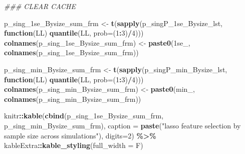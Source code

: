 \documentclass[
]{book}
\newenvironment{Shaded}{\begin{snugshade}}{\end{snugshade}}
\newcommand{\CommentTok}[1]{\textcolor[rgb]{0.56,0.35,0.01}{\textit{#1}}}
\newcommand{\ControlFlowTok}[1]{\textcolor[rgb]{0.13,0.29,0.53}{\textbf{#1}}}
\newcommand{\DataTypeTok}[1]{\textcolor[rgb]{0.13,0.29,0.53}{#1}}
\newcommand{\DecValTok}[1]{\textcolor[rgb]{0.00,0.00,0.81}{#1}}
\newcommand{\KeywordTok}[1]{\textcolor[rgb]{0.13,0.29,0.53}{\textbf{#1}}}
\newcommand{\NormalTok}[1]{#1}
\newcommand{\OperatorTok}[1]{\textcolor[rgb]{0.81,0.36,0.00}{\textbf{#1}}}
\newcommand{\StringTok}[1]{\textcolor[rgb]{0.31,0.60,0.02}{#1}}
\begin{document}
\begin{Shaded}
\begin{Highlighting}[]
\CommentTok{\#\#\# CLEAR CACHE}

\NormalTok{p\_sing\_1se\_Bysize\_sum\_frm <{-}}\StringTok{ }\KeywordTok{t}\NormalTok{(}\KeywordTok{sapply}\NormalTok{(p\_singP\_1se\_Bysize\_lst, }\ControlFlowTok{function}\NormalTok{(LL) }\KeywordTok{quantile}\NormalTok{(LL, }\DataTypeTok{prob=}\NormalTok{(}\DecValTok{1}\OperatorTok{:}\DecValTok{3}\NormalTok{)}\OperatorTok{/}\DecValTok{4}\NormalTok{)))}
\KeywordTok{colnames}\NormalTok{(p\_sing\_1se\_Bysize\_sum\_frm) <{-}}\StringTok{ }\KeywordTok{paste0}\NormalTok{(}\StringTok{\textquotesingle{}1se\_\textquotesingle{}}\NormalTok{, }\KeywordTok{colnames}\NormalTok{(p\_sing\_1se\_Bysize\_sum\_frm))}
 
\NormalTok{p\_sing\_min\_Bysize\_sum\_frm <{-}}\StringTok{ }\KeywordTok{t}\NormalTok{(}\KeywordTok{sapply}\NormalTok{(p\_singP\_min\_Bysize\_lst, }\ControlFlowTok{function}\NormalTok{(LL) }\KeywordTok{quantile}\NormalTok{(LL, }\DataTypeTok{prob=}\NormalTok{(}\DecValTok{1}\OperatorTok{:}\DecValTok{3}\NormalTok{)}\OperatorTok{/}\DecValTok{4}\NormalTok{)))}
\KeywordTok{colnames}\NormalTok{(p\_sing\_min\_Bysize\_sum\_frm) <{-}}\StringTok{ }\KeywordTok{paste0}\NormalTok{(}\StringTok{\textquotesingle{}min\_\textquotesingle{}}\NormalTok{, }\KeywordTok{colnames}\NormalTok{(p\_sing\_min\_Bysize\_sum\_frm))}

\NormalTok{knitr}\OperatorTok{::}\KeywordTok{kable}\NormalTok{(}\KeywordTok{cbind}\NormalTok{(p\_sing\_1se\_Bysize\_sum\_frm, p\_sing\_min\_Bysize\_sum\_frm),}
    \DataTypeTok{caption =} \KeywordTok{paste}\NormalTok{(}\StringTok{"lasso feature selection by sample size across simulations"}\NormalTok{),}
    \DataTypeTok{digits=}\DecValTok{2}\NormalTok{) }\OperatorTok{\%>\%}
\StringTok{   }\NormalTok{kableExtra}\OperatorTok{::}\KeywordTok{kable\_styling}\NormalTok{(}\DataTypeTok{full\_width =}\NormalTok{ F)}
\end{Highlighting}
\end{Shaded}
\end{document}
